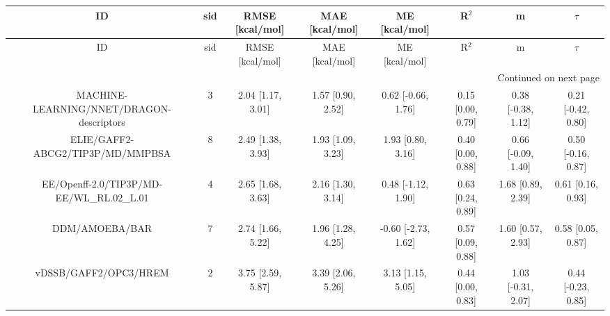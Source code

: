 \documentclass[8pt]{article}
\begin{document}
\begin{center}
\begin{footnotesize}
\begin{longtable}{|cccccccc|}
\toprule
                                       ID & sid &   RMSE [kcal/mol] &    MAE [kcal/mol] &       ME [kcal/mol] &             R$^2$ &                  m &             $\tau$ \\
\midrule
\endfirsthead

\toprule
                                       ID & sid &   RMSE [kcal/mol] &    MAE [kcal/mol] &       ME [kcal/mol] &             R$^2$ &                  m &             $\tau$ \\
\midrule
\endhead
\midrule
\multicolumn{8}{r}{{Continued on next page}} \\
\midrule
\endfoot

\bottomrule
\endlastfoot
 MACHINE-LEARNING/NNET/DRAGON-descriptors &   3 & 2.04 [1.17, 3.01] & 1.57 [0.90, 2.52] &  0.62 [-0.66, 1.76] & 0.15 [0.00, 0.79] & 0.38 [-0.38, 1.12] & 0.21 [-0.42, 0.80] \\
         ELIE/GAFF2-ABCG2/TIP3P/MD/MMPBSA &   8 & 2.49 [1.38, 3.93] & 1.93 [1.09, 3.23] &   1.93 [0.80, 3.16] & 0.40 [0.00, 0.88] & 0.66 [-0.09, 1.40] & 0.50 [-0.16, 0.87] \\
EE/Openff-2.0/TIP3P/MD-EE/WL\_RL.02\_L.01 &   4 & 2.65 [1.68, 3.63] & 2.16 [1.30, 3.14] &  0.48 [-1.12, 1.90] & 0.63 [0.24, 0.89] &  1.68 [0.89, 2.39] &  0.61 [0.16, 0.93] \\
                           DDM/AMOEBA/BAR &   7 & 2.74 [1.66, 5.22] & 1.96 [1.28, 4.25] & -0.60 [-2.73, 1.62] & 0.57 [0.09, 0.88] &  1.60 [0.57, 2.93] &  0.58 [0.05, 0.87] \\
                    vDSSB/GAFF2/OPC3/HREM &   2 & 3.75 [2.59, 5.87] & 3.39 [2.06, 5.26] &   3.13 [1.15, 5.05] & 0.44 [0.00, 0.83] & 1.03 [-0.31, 2.07] & 0.44 [-0.23, 0.85] \\
\end{longtable}
\end{footnotesize}
\end{center}
\end{document}
